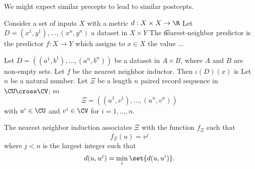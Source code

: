 
We might expect similar precepts to lead to similar postcepts.

Consider a set of inputs $X$ with a metric $d: X \times X \to \R$
Let $D = (x^1, y^1), \dots, (x^n, y^n)$ a dataset in $X \times Y$
The \t{nearest-neighbor predictor} is the predictor $f: X \to Y$ which assigns to $x \in X$ the value ...

Let $D = ((a^1, b^1), \dots, (a^n, b^n))$ be a dataset in $A \times B$, where $A$ and $B$ are non-empty sets.
Let $f$ be the nearest neighbor inductor.
Then $\iota(D)(x)$ is
Let $n$ be a natural number.
Let $\Xi$ be a length $n$ paired record sequence in $\CU \cross \CV$; so
\[
\Xi = ((u^1, v^1), \dots, (u^n, v^n))
\]
with $u^i \in \CU$ and $v^i \in \CV$ for $i = 1,\dots,n$.

The nearest neighbor induction associates
$\Xi$ with the function $f_{\Xi}$ such that
  \[
f_{\Xi}(u) = v^j
  \]
where $j < n$ is the largest integer such that
  \[
d(u, u^j) = \min_{i} \set{d(u, u^i)}.
  \]

\blankpage
